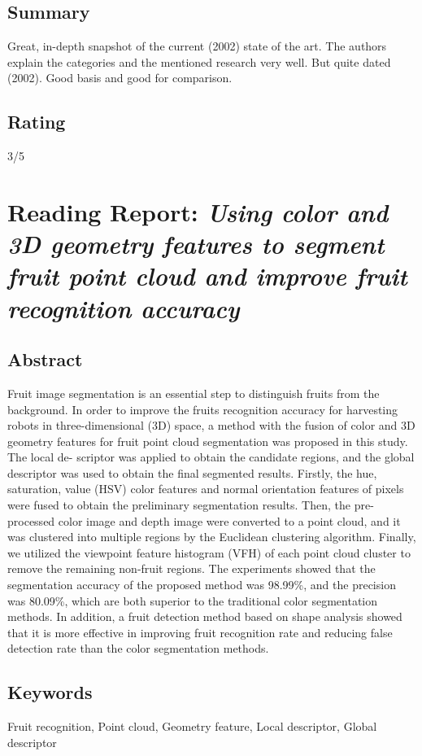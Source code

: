 \documentclass{article}
\begin{document}
\subsection*{Summary}
Great, in-depth snapshot of the current (2002) state of the art. The authors explain the categories and the mentioned research very well.
But quite dated (2002). Good basis and good for comparison.

\subsection*{Rating}
3/5


\section{Reading Report: \emph{Using color and 3D geometry features to segment fruit point cloud and improve fruit recognition accuracy}}
\cite{Wu2020}

\subsection*{Abstract}
Fruit image segmentation is an essential step to distinguish fruits from the background. In order to improve the
fruits recognition accuracy for harvesting robots in three-dimensional (3D) space, a method with the fusion of
color and 3D geometry features for fruit point cloud segmentation was proposed in this study. The local de-
scriptor was applied to obtain the candidate regions, and the global descriptor was used to obtain the final
segmented results. Firstly, the hue, saturation, value (HSV) color features and normal orientation features of
pixels were fused to obtain the preliminary segmentation results. Then, the pre-processed color image and depth
image were converted to a point cloud, and it was clustered into multiple regions by the Euclidean clustering
algorithm. Finally, we utilized the viewpoint feature histogram (VFH) of each point cloud cluster to remove the
remaining non-fruit regions. The experiments showed that the segmentation accuracy of the proposed method
was 98.99\%, and the precision was 80.09\%, which are both superior to the traditional color segmentation
methods. In addition, a fruit detection method based on shape analysis showed that it is more effective in
improving fruit recognition rate and reducing false detection rate than the color segmentation methods.

\subsection*{Keywords}
Fruit recognition, Point cloud, Geometry feature, Local descriptor, Global descriptor
\end{document}
